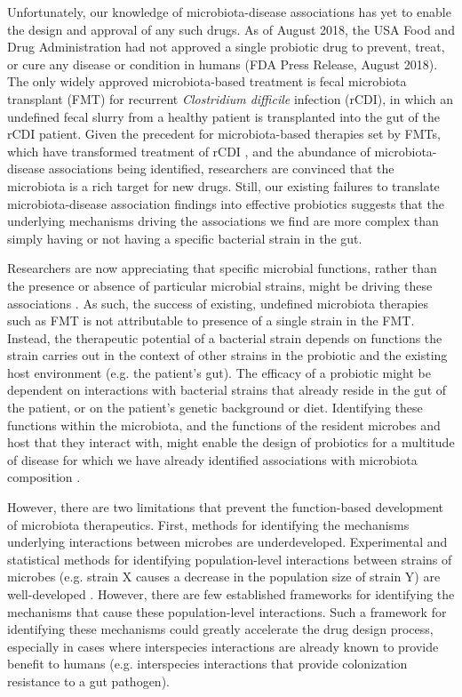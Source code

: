 \documentclass[11pt,onecolumn,notitlepage,openany,twoside]{book}
\begin{document}
\begin{refsection}
Unfortunately, our knowledge of microbiota-disease associations has yet to enable the design and approval of any such drugs. As of August 2018, the USA Food and Drug Administration had not approved a single probiotic drug to prevent, treat, or cure any disease or condition in humans (FDA Press Release, August 2018). The only widely approved microbiota-based treatment is fecal microbiota transplant (FMT) for recurrent \textit{Clostridium difficile} infection (rCDI), in which an undefined fecal slurry from a healthy patient is transplanted into the gut of the rCDI patient. Given the precedent for microbiota-based therapies set by FMTs, which have transformed treatment of rCDI \cite{Kelly2016-ph}, and the abundance of microbiota-disease associations being identified, researchers are convinced that the microbiota is a rich target for new drugs. Still, our existing failures to translate microbiota-disease association findings into effective probiotics suggests that the underlying mechanisms driving the associations we find are more complex than simply having or not having a specific bacterial strain in the gut.

Researchers are now appreciating that specific microbial functions, rather than the presence or absence of particular microbial strains, might be driving these associations \cite{Heintz-Buschart2018-xc}. As such, the success of existing, undefined microbiota therapies such as FMT is not attributable to presence of a single strain in the FMT. Instead, the therapeutic potential of a bacterial strain depends on functions the strain carries out in the context of other strains in the probiotic and the existing host environment (e.g. the patient’s gut). The efficacy of a probiotic might be dependent on interactions with bacterial strains that already reside in the gut of the patient, or on the patient’s genetic background or diet. Identifying these functions within the microbiota, and the functions of the resident microbes and host that they interact with, might enable the design of probiotics for a multitude of disease for which we have already identified associations with microbiota composition \cite{OToole2017-th}.

However, there are two limitations that prevent the function-based development of microbiota therapeutics. First, methods for identifying the mechanisms underlying interactions between microbes are underdeveloped. Experimental and statistical methods for identifying population-level interactions between strains of microbes (e.g. strain X causes a decrease in the population size of strain Y) are well-developed \cite{Gilbert2016-oe}. However, there are few established frameworks for identifying the mechanisms that cause these population-level interactions. Such a framework for identifying these mechanisms could greatly accelerate the drug design process, especially in cases where interspecies interactions are already known to provide benefit to humans (e.g. interspecies interactions that provide colonization resistance to a gut pathogen).


\end{refsection}
\end{document}
